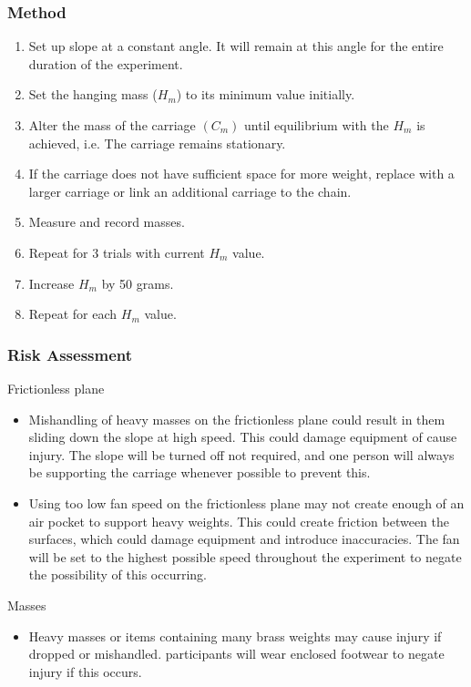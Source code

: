 \documentclass[11pt,a4paper]{article}
\begin{document}
\subsubsection{Method}
\begin{enumerate}
\item Set up slope at a constant angle. It will remain at this angle for the entire duration of the experiment. 
\item Set the hanging mass ($H_m$) to its minimum value initially.
\item Alter the mass of the carriage $(C_m)$ until equilibrium with the $H_m$ is achieved, i.e. The carriage remains stationary. 
\item If the carriage does not have sufficient space for more weight, replace with a larger carriage or link an additional carriage to the chain.  
\item Measure and record masses. 
\item Repeat for 3 trials with current $H_m$ value.
\item Increase $H_m$ by 50 grams. 
\item Repeat for each $H_m$ value.
\end{enumerate}


\subsubsection{Risk Assessment}
Frictionless plane
\begin{itemize}
	\item Mishandling of heavy masses on the frictionless plane could result in them sliding down the slope at high speed. This could damage equipment of cause injury. The slope will be turned off not required, and one person will always be supporting the carriage whenever possible to prevent this. 
	\item Using too low fan speed on the frictionless plane may not create enough of an air pocket to support heavy weights. This could create friction between the surfaces, which could damage equipment and introduce inaccuracies. The fan will be set to the highest possible speed throughout the experiment to negate the possibility of this occurring.
\end{itemize}
Masses
\begin{itemize}
	\item Heavy masses or items containing many brass weights may cause injury if dropped or mishandled. participants will wear enclosed footwear to negate injury if this occurs.  
\end{itemize}
\end{document}
